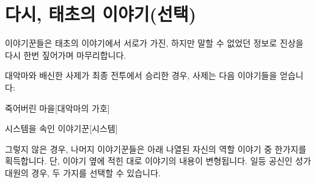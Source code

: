 \documentclass{report}
\begin{document}
	\section{다시, 태초의 이야기(선택)}
		이야기꾼들은 태초의 이야기에서 서로가 가진, 하지만 말할 수 없었던 정보로 진상을 다시 한번 짚어가며 마무리합니다.
		
		대악마와 배신한 사제가 최종 전투에서 승리한 경우, 사제는 다음 이야기들을 얻습니다:
		\begin{story}{죽어버린 마을}{[대악마의 가호]}
		\end{story}
		
		\begin{story}{시스템을 속인 이야기꾼}{[시스템]}
		\end{story}
		
		그렇지 않은 경우, 나머지 이야기꾼들은 아래 나열된 자신의 역할 이야기 중 한가지를 획득합니다. 단, 이야기 옆에 적힌 대로 이야기의 내용이 변형됩니다. 일등 공신인 성가대원의 경우, 두 가지를 선택할 수 있습니다.
		
\end{document}
